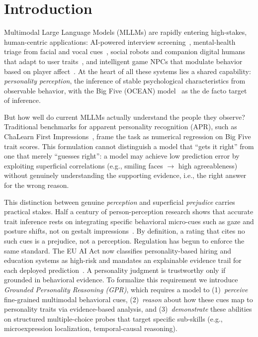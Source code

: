 \documentclass{article}
\newcommand{\taskname}{Grounded Personality Reasoning}
\newcommand{\taskabbr}{GPR}
\begin{document}
\section{Introduction}
\label{sec:intro}

Multimodal Large Language Models (MLLMs) are rapidly entering high-stakes, human-centric applications: AI-powered interview screening~\cite{naim2016automated}, mental-health triage from facial and vocal cues~\cite{gratch2014distress}, social robots and companion digital humans that adapt to user traits~\cite{tang2025robot,cai2025towards}, and intelligent game NPCs that modulate behavior based on player affect~\cite{garavaglia2022moody5}. At the heart of all these systems lies a shared capability: \emph{personality perception}, the inference of stable psychological characteristics from observable behavior, with the Big Five (OCEAN) model~\cite{john2008paradigm} as the de facto target of inference.

But how well do current MLLMs actually understand the people they observe? Traditional benchmarks for apparent personality recognition (APR), such as ChaLearn First Impressions~\cite{ponce2016chalearn,escalante2020modeling}, frame the task as numerical regression on Big Five trait scores. This formulation cannot distinguish a model that ``gets it right'' from one that merely ``guesses right'': a model may achieve low prediction error by exploiting superficial correlations (e.g., smiling faces $\rightarrow$ high agreeableness) without genuinely understanding the supporting evidence, i.e., the right answer for the wrong reason.

This distinction between genuine \emph{perception} and superficial \emph{prejudice} carries practical stakes. 
Half a century of person-perception research shows that accurate trait inference rests on integrating specific behavioral micro-cues such as gaze and posture shifts, not on gestalt impressions~\cite{funder1995accuracy,ambady1992thin,liu2021generalizing}. By definition, a rating that cites no such cues is a prejudice, not a perception. Regulation has begun to enforce the same standard. The EU AI Act now classifies personality-based hiring and education systems as high-risk and mandates an explainable evidence trail for each deployed prediction~\cite{council2024regulation}. A personality judgment is trustworthy only if grounded in behavioral evidence. To formalize this requirement we introduce \emph{\taskname{} (\taskabbr{})}, which requires a model to (1)~\emph{perceive} fine-grained multimodal behavioral cues, (2)~\emph{reason} about how these cues map to personality traits via evidence-based analysis, and (3)~\emph{demonstrate} these abilities on structured multiple-choice probes that target specific sub-skills (e.g., microexpression localization, temporal-causal reasoning).
\end{document}
